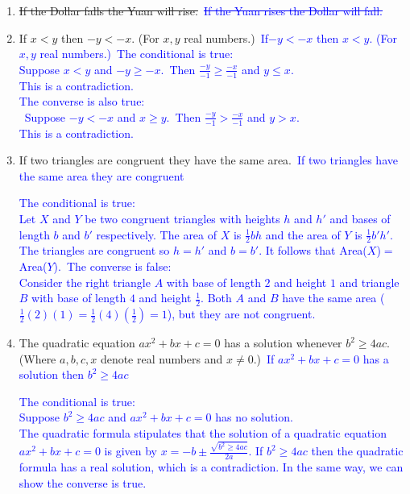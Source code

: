 \documentclass[13.5pt]{article}
\begin{document}
\begin{enumerate}
\begin{enumerate}
\setlength{\itemindent}{.1in}
\item \sout{If the Dollar falls the Yuan will rise.}\
\textcolor{blue} {\sout{If the Yuan rises the Dollar will fall.}}\
\item{If \(x<y\) then \(-y<-x\). (For \( x, y \) real numbers.)}\
\textcolor{blue} {If\(-y<-x\) then \(x<y\). (For \( x, y \) real numbers.)}\
\textcolor{blue} {The conditional is true:}\\
\textcolor{blue} {Suppose \(x<y\) and \(-y \geq -x\).}\
\textcolor{blue} {Then \( \frac{-y}{-1} \geq \frac{-x}{-1}\) and \(y \leq x\).}\\
\textcolor{blue} {This is a contradiction.}\\
\textcolor{blue} {The converse is also true:}\\\
\textcolor{blue} {Suppose \(-y<-x\) and \(x \geq y\).}\
\textcolor{blue} {Then \(\frac{-y}{-1} > \frac{-x}{-1}\) and \(y > x\).}\\
\textcolor{blue} {This is a contradiction.}

\item{If two triangles are congruent they have the same area.}\
\textcolor{blue} {If two triangles have the same area they are congruent}\

\textcolor{blue} {The conditional is true:}\\
\textcolor{blue} {Let \(X\) and \(Y\) be two congruent triangles with heights \(h\) and \(h'\) and bases of length \(b\) and \(b'\) respectively. The area of \(X\) is \(\frac{1}{2}bh\) and the area of \(Y\) is \(\frac{1}{2}b'h'\). The triangles are congruent so \(h=h'\) and \(b=b'\). It follows that Area(\(X\))\(=\)Area(\(Y\)).}\
\textcolor{blue} {The converse is false:}\\
\textcolor{blue} {Consider the right triangle \(A\) with base of length \(2\) and height \(1\) and triangle \(B\) with base of length \(4\) and height \(\frac{1}{2}\). Both \(A\) and \(B\) have the same area (\(\frac{1}{2}(2)(1) = \frac{1}{2}(4)(\frac{1}{2})=1\)), but they are not congruent.}\

\item{The quadratic equation \(ax^2+bx+c=0\) has a solution whenever \(b^2 \geq 4ac\). (Where \(a,b,c,x\) denote real numbers and \(x \neq 0\).)}\
\textcolor{blue} {If \(ax^2+bx+c=0\) has a solution then \(b^2 \geq 4ac\)}\

\textcolor{blue} {The conditional is true:}\\
\textcolor{blue} {Suppose \(b^2 \geq 4ac\) and \(ax^2+bx+c=0\) has no solution.}\\
\textcolor{blue} {The quadratic formula stipulates that the solution of a quadratic equation \(ax^2+bx+c=0\) is given by \( x= -b \pm \frac{\sqrt{b^2 \geq 4ac}}{2a}\). If \(b^2 \geq 4ac\) then the quadratic formula has a real solution, which is a contradiction.}
\textcolor{blue} {In the same way, we can show the converse is true.}


\end{enumerate}
\end{enumerate}
\end{document}
